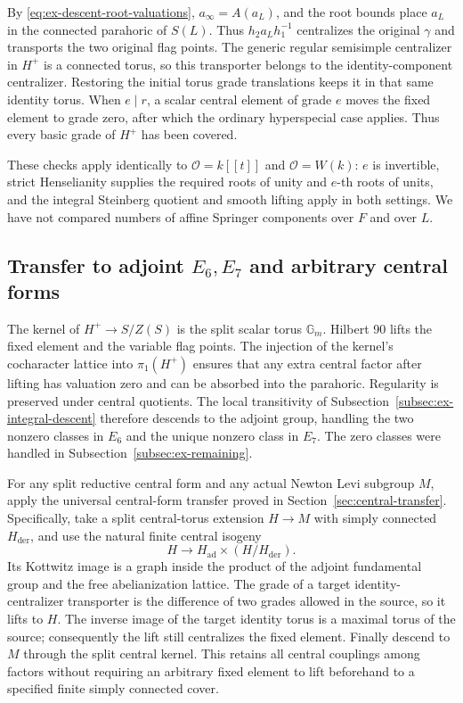 \documentclass[11pt,a4paper]{article}
\theoremstyle{definition}
\theoremstyle{remark}
\begin{document}
By \eqref{eq:ex-descent-root-valuations},
\(a_\infty=A(a_L)\), and the root bounds place \(a_L\) in the connected
parahoric of \(S(L)\).
Thus \(h_2a_Lh_1^{-1}\) centralizes the original \(\gamma\) and transports
the two original flag points.
The generic regular semisimple centralizer in \(H^+\) is a connected
torus, so this transporter belongs to the identity-component centralizer.
Restoring the initial torus grade translations keeps it in that same
identity torus.
When \(e\mid r\), a scalar central element of grade \(e\) moves the fixed
element to grade zero, after which the ordinary hyperspecial case applies.
Thus every basic grade of \(H^+\) has been covered.

These checks apply identically to
\(\mathcal O=k[[t]]\) and \(\mathcal O=W(k)\):
\(e\) is invertible, strict Henselianity supplies the required roots of
unity and \(e\)-th roots of units, and the integral Steinberg quotient and
smooth lifting apply in both settings.
We have not compared numbers of affine Springer components over \(F\)
and over \(L\).

\subsection{Transfer to adjoint \(E_6,E_7\) and arbitrary central forms}
\label{subsec:ex-central-forms}

The kernel of \(H^+\longrightarrow S/Z(S)\) is the split scalar torus
\(\mathbb G_m\).
Hilbert 90 lifts the fixed element and the variable flag points.
The injection of the kernel's cocharacter lattice into \(\pi_1(H^+)\)
ensures that any extra central factor after lifting has valuation zero
and can be absorbed into the parahoric.
Regularity is preserved under central quotients.
The local transitivity of Subsection~\ref{subsec:ex-integral-descent}
therefore descends to the adjoint group, handling the two nonzero classes
in \(E_6\) and the unique nonzero class in \(E_7\).
The zero classes were handled in Subsection~\ref{subsec:ex-remaining}.

For any split reductive central form and any actual Newton Levi subgroup
\(M\), apply the universal central-form transfer proved in
Section~\ref{sec:central-transfer}.
Specifically, take a split central-torus extension \(H\longrightarrow M\)
with simply connected \(H_{\mathrm{der}}\), and use the natural finite
central isogeny
\begin{equation}\label{eq:ex-universal-central-isogeny}
H\longrightarrow H_{\mathrm{ad}}\times(H/H_{\mathrm{der}}).
\end{equation}
Its Kottwitz image is a graph inside the product of the adjoint
fundamental group and the free abelianization lattice.
The grade of a target identity-centralizer transporter is the difference
of two grades allowed in the source, so it lifts to \(H\).
The inverse image of the target identity torus is a maximal torus of the
source; consequently the lift still centralizes the fixed element.
Finally descend to \(M\) through the split central kernel.
This retains all central couplings among factors without requiring an
arbitrary fixed element to lift beforehand to a specified finite simply
connected cover.
\end{document}
